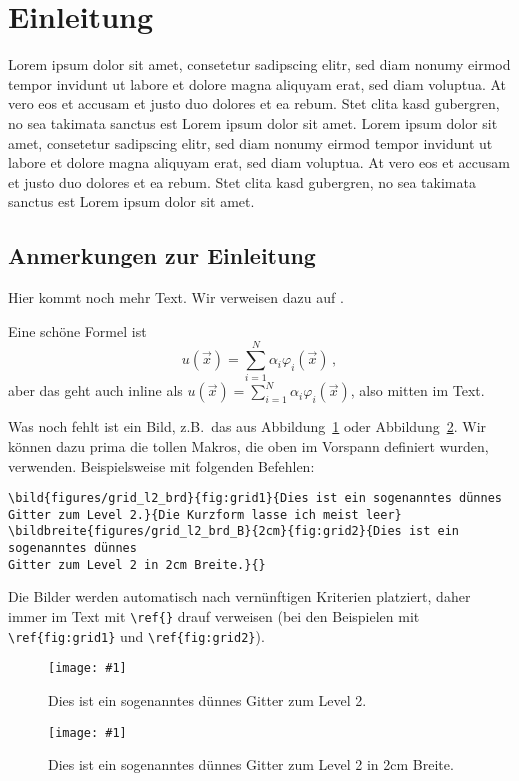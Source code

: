 \documentclass[a4paper,12pt]{llncs}
\numberwithin{equation}{section}
\newcommand{\bild}[4]{
  \begin{figure}[htbp]
    \begin{center}
      \texttt{[image: \#1]}
      \caption[#4]{#3}
      \label{#2}
    \end{center}
  \end{figure}
}
\newcommand{\bildbreite}[5]{
  \begin{figure}[htbp]
    \begin{center}
      \texttt{[image: \#1]}
      \caption[#5]{#4}
      \label{#3}
    \end{center}
  \end{figure}
}
\begin{document}
\section{Einleitung}
Lorem ipsum dolor sit amet, consetetur sadipscing elitr, sed diam nonumy eirmod tempor invidunt ut labore et dolore magna aliquyam erat, sed diam voluptua. At vero eos et accusam et justo duo dolores et ea rebum. Stet clita kasd gubergren, no sea takimata sanctus est Lorem ipsum dolor sit amet. Lorem ipsum dolor sit amet, consetetur sadipscing elitr, sed diam nonumy eirmod tempor invidunt ut labore et dolore magna aliquyam erat, sed diam voluptua. At vero eos et accusam et justo duo dolores et ea rebum. Stet clita kasd gubergren, no sea takimata sanctus est Lorem ipsum dolor sit amet.

\subsection{Anmerkungen zur Einleitung}
Hier kommt noch mehr Text. Wir verweisen dazu auf
\cite{thisdocument}.

Eine schöne Formel ist
\[
u(\vec{x}) = \sum_{i=1}^N \alpha_i \varphi_i(\vec{x}) \,,
\]
aber das geht auch inline als $u(\vec{x}) = \sum_{i=1}^N \alpha_i
\varphi_i(\vec{x})$, also mitten im Text.

Was noch fehlt ist ein Bild, z.B.\ das aus
Abbildung~\ref{fig:grid1} oder Abbildung~\ref{fig:grid2}. Wir können dazu prima die tollen Makros,
die oben im Vorspann definiert wurden, verwenden. Beispielsweise mit
folgenden Befehlen:
\begin{verbatim}
\bild{figures/grid_l2_brd}{fig:grid1}{Dies ist ein sogenanntes dünnes
Gitter zum Level 2.}{Die Kurzform lasse ich meist leer}
\bildbreite{figures/grid_l2_brd_B}{2cm}{fig:grid2}{Dies ist ein sogenanntes dünnes
Gitter zum Level 2 in 2cm Breite.}{}
\end{verbatim}
Die Bilder werden automatisch nach vernünftigen Kriterien platziert,
daher immer im Text mit \verb!\ref{}! drauf verweisen (bei den
Beispielen mit \verb!\ref{fig:grid1}! und \verb!\ref{fig:grid2}!).
\bild{figures/grid_l2_brd}{fig:grid1}{Dies ist ein sogenanntes dünnes
  Gitter zum Level 2.}{Die Kurzform lasse ich meist leer}
\bildbreite{figures/grid_l2_brd}{2cm}{fig:grid2}{Dies ist ein sogenanntes dünnes
Gitter zum Level 2 in 2cm Breite.}{}
\end{document}
